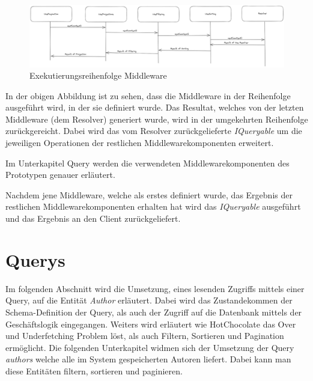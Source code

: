 \begin{figure}[H]
    \includegraphics[width=\textwidth]{pics/middleware.png}
    \caption{Exekutierungsreihenfolge Middleware}
\end{figure}

In der obigen Abbildung ist zu sehen, dass die Middleware in der Reihenfolge ausgeführt wird, in der sie definiert wurde.
Das Resultat, welches von der letzten Middleware (dem Resolver) generiert wurde, wird in der umgekehrten Reihenfolge zurückgereicht.
Dabei wird das vom Resolver zurückgelieferte \textit{IQueryable} um die jeweiligen Operationen der restlichen Middlewarekomponenten erweitert.
\newline

Im Unterkapitel Query werden die verwendeten Middlewarekomponenten des Prototypen genauer erläutert.

Nachdem jene Middleware, welche als erstes definiert wurde, das Ergebnis der restlichen Middlewarekomponenten erhalten hat wird das \textit{IQueryable} ausgeführt und das Ergebnis an den Client zurückgeliefert.

\section{Querys}
Im folgenden Abschnitt wird die Umsetzung, eines lesenden Zugriffs mittels einer Query, auf die Entität \textit{Author} erläutert.
Dabei wird das Zustandekommen der Schema-Definition der Query, als auch der Zugriff auf die Datenbank mittels der Geschäftslogik eingegangen.
Weiters wird erläutert wie HotChocolate das Over und Underfetching Problem löst, als auch Filtern, Sortieren und Pagination ermöglicht.
\newline
Die folgenden Unterkapitel widmen sich der Umsetzung der Query \textit{authors} welche alle im System gespeicherten Autoren liefert.
Dabei kann man diese Entitäten filtern, sortieren und paginieren. %

